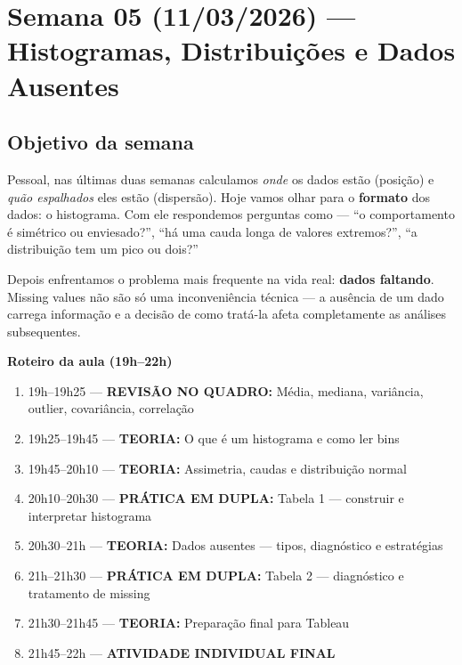 
\chapter{Semana 05 (11/03/2026) — Histogramas, Distribuições e Dados Ausentes}

\section{Objetivo da semana}

Pessoal, nas últimas duas semanas calculamos \emph{onde} os dados estão
(posição) e \emph{quão espalhados} eles estão (dispersão). Hoje vamos olhar
para o \textbf{formato} dos dados: o histograma. Com ele respondemos perguntas
como — ``o comportamento é simétrico ou enviesado?'', ``há uma cauda
longa de valores extremos?'', ``a distribuição tem um pico ou dois?''

Depois enfrentamos o problema mais frequente na vida real: \textbf{dados
faltando}. Missing values não são só uma inconveniência técnica — a ausência
de um dado carrega informação e a decisão de como tratá-la afeta completamente
as análises subsequentes.

\begin{BoardBox}
\textbf{Roteiro da aula (19h–22h)}
\begin{enumerate}
  \item 19h–19h25 — \textbf{REVISÃO NO QUADRO:} Média, mediana, variância, outlier, covariância, correlação
  \item 19h25–19h45 — \textbf{TEORIA:} O que é um histograma e como ler bins
  \item 19h45–20h10 — \textbf{TEORIA:} Assimetria, caudas e distribuição normal
  \item 20h10–20h30 — \textbf{PRÁTICA EM DUPLA:} Tabela 1 — construir e interpretar histograma
  \item 20h30–21h — \textbf{TEORIA:} Dados ausentes — tipos, diagnóstico e estratégias
  \item 21h–21h30 — \textbf{PRÁTICA EM DUPLA:} Tabela 2 — diagnóstico e tratamento de missing
  \item 21h30–21h45 — \textbf{TEORIA:} Preparação final para Tableau
  \item 21h45–22h — \textbf{ATIVIDADE INDIVIDUAL FINAL}
\end{enumerate}
\end{BoardBox}

